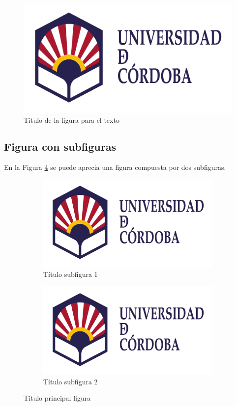 \begin{figure}[H]
  \centering
  \includegraphics[width=.8\linewidth]{Imagenes/logo_uco}  
  \caption[Titulo de la figura para el índice de figuras. En este no se deben poner referencias a citas]{Título de la figura para el texto}
  \label{fig:figura_unica}
\end{figure}

\subsection{Figura con subfiguras}

En la Figura \ref{figT:subfiguras} se puede aprecia una figura compuesta por dos subfiguras.

\begin{figure}[H]
\begin{subfigure}{.5\textwidth}
  \centering
  \includegraphics[width=.8\linewidth]{Imagenes/logo_uco}  
  \caption{Título subfigura 1}
  \label{fig:sub-first}
\end{subfigure}
\begin{subfigure}{.5\textwidth}
  \centering
  \includegraphics[width=.8\linewidth]{Imagenes/logo_uco}  
  \caption{Título subfigura 2}
  \label{fig:sub-second}
\end{subfigure}
\caption{Titulo principal figura}
\label{figT:subfiguras}
\end{figure}

